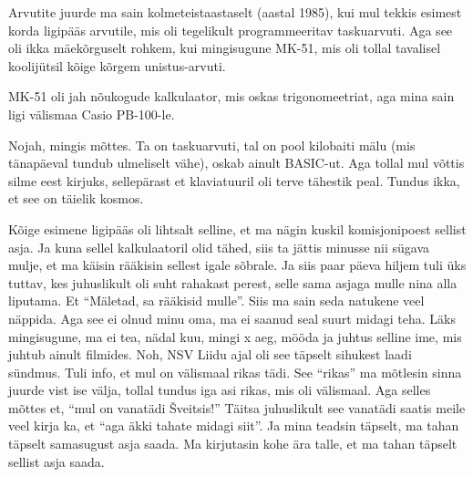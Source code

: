 \label{sisu:tonu}


Arvutite juurde ma sain kolmeteistaastaselt (aastal 1985), kui mul tekkis 
esimest korda ligipääs arvutile, mis oli tegelikult programmeeritav 
taskuarvuti. Aga see oli ikka mäekõrguselt rohkem, kui mingisugune 
MK-51, mis oli tollal 
tavalisel koolijütsil kõige kõrgem unistus-arvuti. 


MK-51 oli jah nõukogude kalkulaator, mis oskas trigonomeetriat, aga mina sain 
ligi välismaa Casio PB-100-le. 


Nojah, mingis mõttes. Ta on taskuarvuti, tal on pool kilobaiti mälu (mis 
tänapäeval tundub ulmeliselt vähe), oskab ainult BASIC-ut. Aga tollal mul 
võttis silme eest kirjuks, sellepärast et klaviatuuril oli terve tähestik peal. 
Tundus ikka, et see on täielik kosmos. 


Kõige esimene ligipääs oli lihtsalt selline, et ma nägin kuskil komisjonipoest 
sellist asja. Ja kuna sellel kalkulaatoril olid tähed, siis ta jättis minusse 
nii sügava mulje, et ma käisin rääkisin sellest igale sõbrale. Ja siis paar 
päeva hiljem tuli üks tuttav, kes juhuslikult oli suht rahakast perest, selle 
sama asjaga mulle nina alla liputama. Et \enquote{Mäletad, sa rääkisid mulle}. 
Siis ma sain seda natukene veel näppida. Aga see ei olnud minu oma, ma ei 
saanud seal suurt midagi teha. Läks mingisugune, ma ei tea, nädal kuu, mingi x 
aeg, mööda ja juhtus selline ime, mis juhtub ainult filmides. Noh, NSV Liidu 
ajal oli see täpselt sihukest laadi sündmus. Tuli info, et mul on välismaal 
rikas tädi. See \enquote{rikas} ma mõtlesin sinna juurde vist ise välja, tollal 
tundus iga asi rikas, mis oli välismaal. Aga selles mõttes et, \enquote{mul on 
vanatädi Šveitsis!} Täitsa juhuslikult see vanatädi saatis meile veel kirja ka, 
et \enquote{aga äkki tahate midagi siit}. Ja mina teadsin täpselt, ma tahan 
täpselt samasugust asja 
saada. Ma kirjutasin kohe ära talle, et ma tahan täpselt sellist asja saada.


